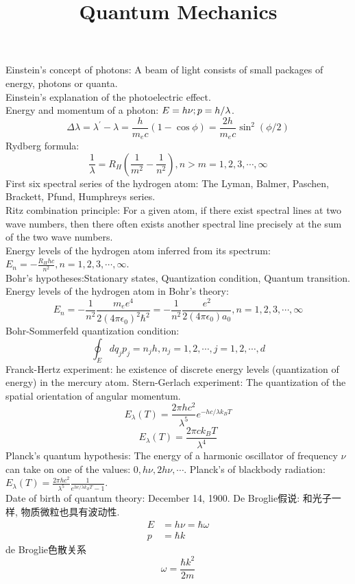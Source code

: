 \documentclass[UTF8]{ctexart}
\title{Quantum Mechanics}
\numberwithin{equation}{subsection}
\begin{document}
\maketitle
\tableofcontents
\newpage
{}
Einstein's concept of photons: A beam of light consists of small packages of energy, photons or quanta.\\
Einstein's explanation of the photoelectric effect.\\
Energy and momentum of a photon: $E = h\nu; p = h/\lambda$.
$$
\Delta \lambda=\lambda^{\prime}-\lambda=\frac{h}{m_{e} c}(1-\cos \phi)=\frac{2 h}{m_{e} c} \sin ^{2}(\phi / 2)
$$
Rydberg formula:
$$
\frac{1}{\lambda}=R_{H}\left(\frac{1}{m^{2}}-\frac{1}{n^{2}}\right), n>m=1,2,3, \cdots, \infty
$$
First six spectral series of the hydrogen atom: The Lyman, Balmer, Paschen, Brackett, Pfund, Humphreys series.\\
Ritz combination principle: For a given atom, if there exist spectral lines at two wave numbers, then there often exists another spectral line precisely at the sum of the two wave numbers.\\
Energy levels of the hydrogen atom inferred from its spectrum: $E_{n}=-\frac{R_{H} h c}{n^{2}}, n=1,2,3, \cdots, \infty$.\\
Bohr's hypotheses:Stationary states, Quantization condition, Quantum transition.\\
Energy levels of the hydrogen atom in Bohr's theory:
$$
E_{n}=-\frac{1}{n^{2}} \frac{m_{e} e^{4}}{2\left(4 \pi \epsilon_{0}\right)^{2} \hbar^{2}}=-\frac{1}{n^{2}} \frac{e^{2}}{2\left(4 \pi \epsilon_{0}\right) a_{0}}, n=1,2,3, \cdots, \infty
$$
Bohr-Sommerfeld quantization condition:
$$
\oint_{E} d q_{j} p_{j}=n_{j} h, n_{j}=1,2, \cdots, j=1,2, \cdots, d
$$
Franck-Hertz experiment: he existence of discrete energy levels (quantization of energy) in the mercury atom.
Stern-Gerlach experiment: The quantization of the spatial orientation of angular momentum.
$$
E_{\lambda}(T)=\frac{2 \pi h c^{2}}{\lambda^{5}} e^{-h c / \lambda k_{B} T}
$$
$$
E_{\lambda}(T)=\frac{2 \pi c k_{B} T}{\lambda^{4}}
$$
Planck's quantum hypothesis: The energy of a harmonic oscillator of frequency $\nu$ can take on one of the values: $0,h\nu,2h\nu,\cdots$.
Planck's of blackbody radiation:$E_{\lambda}(T)=\frac{2 \pi h c^{2}}{\lambda^{5}} \frac{1}{e^{h c / \lambda k_{B} T}-1}$.\\
Date of birth of quantum theory: December 14, 1900.
De Broglie假说: 和光子一样, 物质微粒也具有波动性. 
$$\begin{aligned}
E &= h\nu = \hbar \omega \\
{p} &= \hbar {k}
\end{aligned}$$
de Broglie色散关系
$$\boxed{\omega ={\frac{\hbar k^{2}}{2m}}}$$
\end{document}
